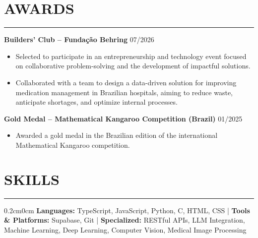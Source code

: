 \documentclass[10pt,a4paper]{article}
\begin{document}
\section*{AWARDS}
\vspace{-2.5mm}
\hrule
\vspace{1.2mm}

\noindent
\textbf{Builders' Club -- Fundação Behring}
\hfill 07/2026
\begin{itemize}[leftmargin=*,itemsep=-2pt,topsep=0pt,parsep=0pt,partopsep=0pt]
    \item Selected to participate in an entrepreneurship and technology
    event focused on collaborative problem-solving and the development
    of impactful solutions.

    \item Collaborated with a team to design a data-driven solution for
    improving medication management in Brazilian hospitals, aiming to
    reduce waste, anticipate shortages, and optimize internal processes.
\end{itemize}

\vspace{1mm}

\noindent
\textbf{Gold Medal -- Mathematical Kangaroo Competition (Brazil)}
\hfill 01/2025
\begin{itemize}[leftmargin=*,itemsep=-2pt,topsep=0pt,parsep=0pt,partopsep=0pt]
    \item Awarded a gold medal in the Brazilian edition of the
    international Mathematical Kangaroo competition.
\end{itemize}

\section*{SKILLS}
\vspace{-2.5mm}
\hrule
\vspace{1.2mm}

\begin{adjustwidth}{0.2cm}{0cm}
\textbf{Languages:} TypeScript, JavaScript, Python, C, HTML, CSS
\enspace | \enspace
\textbf{Tools \& Platforms:} Supabase, Git
\enspace | \enspace
\textbf{Specialized:} RESTful APIs, LLM Integration, Machine Learning, Deep Learning, Computer Vision, Medical Image Processing
\end{adjustwidth}
\end{document}
